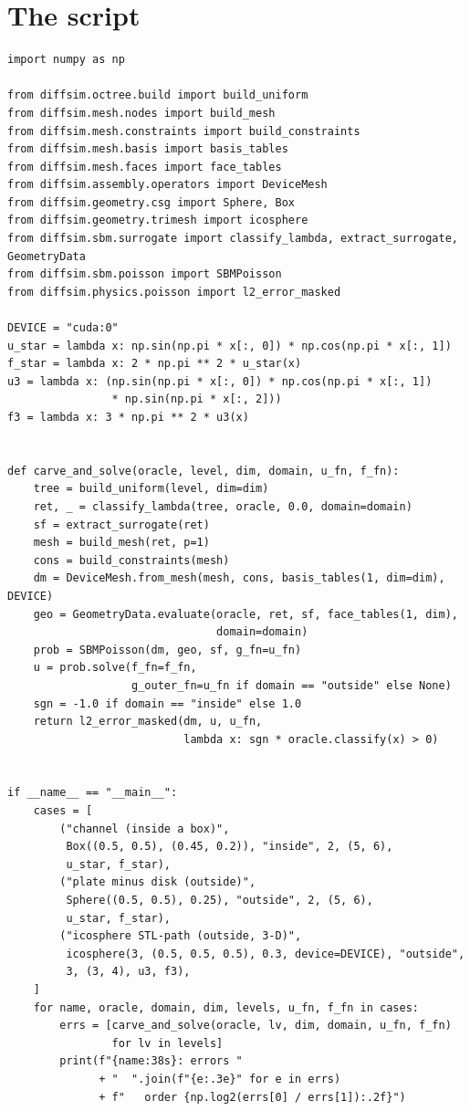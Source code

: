 \section*{The script}
\begin{lstlisting}
import numpy as np

from diffsim.octree.build import build_uniform
from diffsim.mesh.nodes import build_mesh
from diffsim.mesh.constraints import build_constraints
from diffsim.mesh.basis import basis_tables
from diffsim.mesh.faces import face_tables
from diffsim.assembly.operators import DeviceMesh
from diffsim.geometry.csg import Sphere, Box
from diffsim.geometry.trimesh import icosphere
from diffsim.sbm.surrogate import classify_lambda, extract_surrogate, GeometryData
from diffsim.sbm.poisson import SBMPoisson
from diffsim.physics.poisson import l2_error_masked

DEVICE = "cuda:0"
u_star = lambda x: np.sin(np.pi * x[:, 0]) * np.cos(np.pi * x[:, 1])
f_star = lambda x: 2 * np.pi ** 2 * u_star(x)
u3 = lambda x: (np.sin(np.pi * x[:, 0]) * np.cos(np.pi * x[:, 1])
                * np.sin(np.pi * x[:, 2]))
f3 = lambda x: 3 * np.pi ** 2 * u3(x)


def carve_and_solve(oracle, level, dim, domain, u_fn, f_fn):
    tree = build_uniform(level, dim=dim)
    ret, _ = classify_lambda(tree, oracle, 0.0, domain=domain)
    sf = extract_surrogate(ret)
    mesh = build_mesh(ret, p=1)
    cons = build_constraints(mesh)
    dm = DeviceMesh.from_mesh(mesh, cons, basis_tables(1, dim=dim), DEVICE)
    geo = GeometryData.evaluate(oracle, ret, sf, face_tables(1, dim),
                                domain=domain)
    prob = SBMPoisson(dm, geo, sf, g_fn=u_fn)
    u = prob.solve(f_fn=f_fn,
                   g_outer_fn=u_fn if domain == "outside" else None)
    sgn = -1.0 if domain == "inside" else 1.0
    return l2_error_masked(dm, u, u_fn,
                           lambda x: sgn * oracle.classify(x) > 0)


if __name__ == "__main__":
    cases = [
        ("channel (inside a box)",
         Box((0.5, 0.5), (0.45, 0.2)), "inside", 2, (5, 6),
         u_star, f_star),
        ("plate minus disk (outside)",
         Sphere((0.5, 0.5), 0.25), "outside", 2, (5, 6),
         u_star, f_star),
        ("icosphere STL-path (outside, 3-D)",
         icosphere(3, (0.5, 0.5, 0.5), 0.3, device=DEVICE), "outside",
         3, (3, 4), u3, f3),
    ]
    for name, oracle, domain, dim, levels, u_fn, f_fn in cases:
        errs = [carve_and_solve(oracle, lv, dim, domain, u_fn, f_fn)
                for lv in levels]
        print(f"{name:38s}: errors "
              + "  ".join(f"{e:.3e}" for e in errs)
              + f"   order {np.log2(errs[0] / errs[1]):.2f}")
\end{lstlisting}

